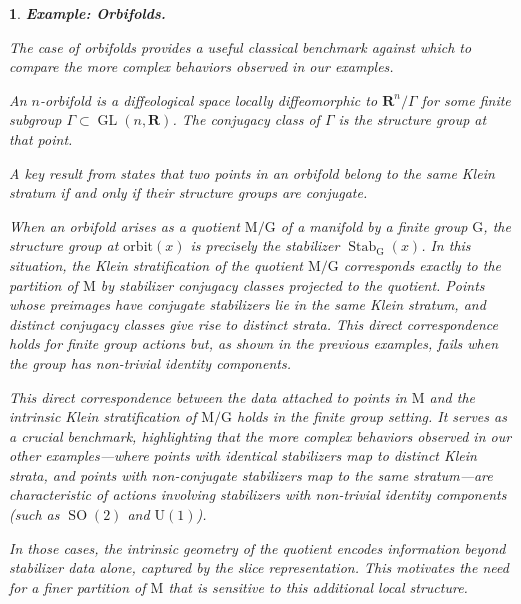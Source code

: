 \documentclass[10pt,reqno,letterpaper,twoside]{amsart}
\theoremstyle{article}
\newtheorem{article}{}
\def\artlabel[#1]{\textbf{#1.}}
\newcommand{\RR}{\mathbf{R}}
\def \G{\mathrm G}
\def \M{\mathrm M}
\def \U{\mathrm U}
\DeclareMathOperator{\GL}{GL}
\DeclareMathOperator{\SO}{SO}
\DeclareMathOperator{\Stab}{Stab}
\newcommand{\orbit}{{\mathrm{orbit}}}
\begin{document}
  
  \begin{article}
    \artlabel[Example: Orbifolds]
    \label{ExampleOrbifolds}
    
    The case of orbifolds provides a useful classical benchmark against which to compare the more complex behaviors observed in our examples.
    
    An $n$-orbifold is a diffeological space locally diffeomorphic to $\RR^n/\Gamma$ for some finite subgroup $\Gamma \subset \GL(n,\RR)$.
    The conjugacy class of $\Gamma$ is the structure group at that point.
    
    A key result from \cite[Lemma 26]{IKZ10} states that two points in an orbifold belong to the same Klein stratum if and only if their structure groups are conjugate.
    
    
    When an orbifold arises as a quotient $\M/\G$ of a manifold by a finite group $\G$,
    the structure group at $\orbit(x)$ is precisely the stabilizer $\Stab_\G(x)$.
    In this situation,
    the Klein stratification of the quotient $\M/\G$ corresponds exactly to the partition of $\M$ by stabilizer conjugacy classes projected to the quotient.
    Points whose preimages have conjugate stabilizers lie in the same Klein stratum,
    and distinct conjugacy classes give rise to distinct strata.
    This direct correspondence holds for finite group actions but,
    as shown in the previous examples,
    fails when the group has non-trivial identity components.
    
    This direct correspondence between the data attached to points in $\M$ and the intrinsic Klein stratification of $\M/\G$ holds in the finite group setting.
    It serves as a crucial benchmark,
    highlighting that the more complex behaviors observed in our other examples—where points with identical stabilizers map to distinct Klein strata,
    and points with non-conjugate stabilizers map to the same stratum—are characteristic of actions involving stabilizers with non-trivial identity components (such as $\SO(2)$ and $\U(1)$).
    
    In those cases,
    the intrinsic geometry of the quotient encodes information beyond stabilizer data alone,
    captured by the slice representation.
    This motivates the need for a finer partition of $\M$ that is sensitive to this additional local structure.
  \end{article}
  
\end{document}
